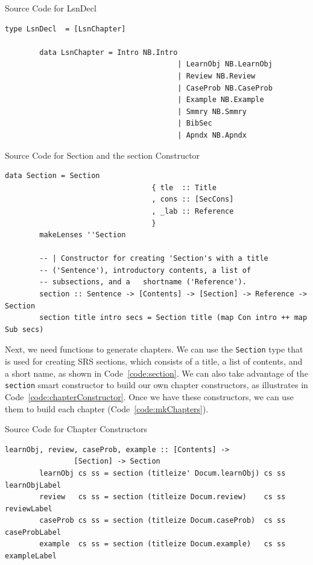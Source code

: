 \begin{listing}[h]
	\caption{Source Code for LsnDecl}
	\label{code:LsnDecl}
	\begin{lstlisting}[language=haskell1]
		type LsnDecl  = [LsnChapter]
		
		data LsnChapter = Intro NB.Intro
										| LearnObj NB.LearnObj
										| Review NB.Review
										| CaseProb NB.CaseProb
										| Example NB.Example
										| Smmry NB.Smmry
										| BibSec
										| Apndx NB.Apndx
	\end{lstlisting}
\end{listing}

\begin{listing}[h!]
	\caption{Source Code for Section and the section Constructor}
	\label{code:section}
	\begin{lstlisting}[language=haskell1]
		data Section = Section
								  { tle  :: Title
								  , cons :: [SecCons]
								  , _lab :: Reference
								  }
		makeLenses ''Section
		
		-- | Constructor for creating 'Section's with a title 
		-- ('Sentence'), introductory contents, a list of 
		-- subsections, and a	shortname ('Reference').
		section :: Sentence -> [Contents] -> [Section] -> Reference -> Section
		section title intro secs = Section title (map Con intro ++ map Sub secs)
	\end{lstlisting}
\end{listing}

Next, we need functions to generate chapters. We can use the \texttt{Section} 
type that is used for creating SRS sections, which consists of a title, a list 
of contents, and a short name, as shown in Code~\ref{code:section}. We can also 
take advantage of the \texttt{section} smart constructor to build our own 
chapter constructors, as illustrates in Code~\ref{code:chapterConstructor}. 
Once we have these constructors, we can use them to build each chapter 
(Code~\ref{code:mkChapters}).

\begin{listing}[h!]
	\caption{Source Code for Chapter Constructors} 
	\label{code:chapterConstructor}
	\begin{lstlisting}[language=haskell1]
		learnObj, review, caseProb, example :: [Contents] -> 
				[Section] -> Section
		learnObj cs ss = section (titleize' Docum.learnObj) cs ss learnObjLabel
		review   cs ss = section (titleize Docum.review)    cs ss reviewLabel
		caseProb cs ss = section (titleize Docum.caseProb)  cs ss caseProbLabel
		example  cs ss = section (titleize Docum.example)   cs ss exampleLabel
	\end{lstlisting}
\end{listing}

